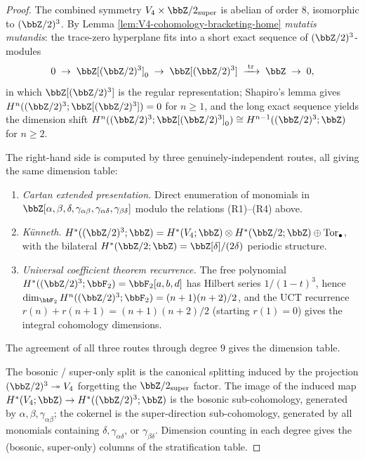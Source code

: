 \begin{proof}
The combined symmetry $V_4 \times \bbZ/2_{\mathrm{super}}$ is abelian
of order $8$, isomorphic to $(\bbZ/2)^3$. By Lemma
\ref{lem:V4-cohomology-bracketing-home} \emph{mutatis mutandis}: the
trace-zero hyperplane fits into a short exact sequence of
$(\bbZ/2)^3$-modules
\[
 0 \;\to\; \bbZ[(\bbZ/2)^3]_0
 \;\to\; \bbZ[(\bbZ/2)^3]
 \;\xrightarrow{\;\mathrm{tr}\;}\;
 \bbZ \;\to\; 0,
\]
in which $\bbZ[(\bbZ/2)^3]$ is the regular representation; Shapiro's
lemma gives $H^n((\bbZ/2)^3; \bbZ[(\bbZ/2)^3]) = 0$ for $n \geq 1$,
and the long exact sequence yields the dimension shift
$H^n((\bbZ/2)^3; \bbZ[(\bbZ/2)^3]_0) \cong H^{n-1}((\bbZ/2)^3; \bbZ)$
for $n \geq 2$.

The right-hand side is computed by three genuinely-independent routes,
all giving the same dimension table:
\begin{enumerate}[label=\textup{(\roman*)}]
\item \emph{Cartan extended presentation.} Direct enumeration of
 monomials in
 $\bbZ[\alpha, \beta, \delta, \gamma_{\alpha\beta},
 \gamma_{\alpha\delta}, \gamma_{\beta\delta}]$
 modulo the relations \textup{(R1)}--\textup{(R4)} above.
\item \emph{K\"unneth.}
 $H^*((\bbZ/2)^3; \bbZ) = H^*(V_4; \bbZ) \otimes H^*(\bbZ/2; \bbZ)
 \oplus \mathrm{Tor}_{\bullet}$, with the bilateral
 $H^*(\bbZ/2; \bbZ) = \bbZ[\delta]/(2\delta)$ periodic structure.
\item \emph{Universal coefficient theorem recurrence.} The free
 polynomial $H^*((\bbZ/2)^3; \bbF_2) = \bbF_2[a, b, d]$ has
 Hilbert series $1/(1-t)^3$, hence
 $\dim_{\bbF_2} H^n((\bbZ/2)^3; \bbF_2) = (n+1)(n+2)/2$, and the
 UCT recurrence
 $r(n) + r(n+1) = (n+1)(n+2)/2$ \textup{(}starting $r(1) = 0$\textup{)}
 gives the integral cohomology dimensions.
\end{enumerate}
The agreement of all three routes through degree \(9\) gives the
dimension table.

The bosonic / super-only split is the canonical splitting induced by
the projection $(\bbZ/2)^3 \twoheadrightarrow V_4$ forgetting the
$\bbZ/2_{\mathrm{super}}$ factor. The image of the induced map
$H^*(V_4; \bbZ) \to H^*((\bbZ/2)^3; \bbZ)$ is the bosonic sub-cohomology,
generated by $\alpha, \beta, \gamma_{\alpha\beta}$; the cokernel is the
super-direction sub-cohomology, generated by all monomials containing
$\delta, \gamma_{\alpha\delta}$, or $\gamma_{\beta\delta}$. Dimension
counting in each degree gives the (bosonic, super-only) columns of the
stratification table.
\end{proof}

